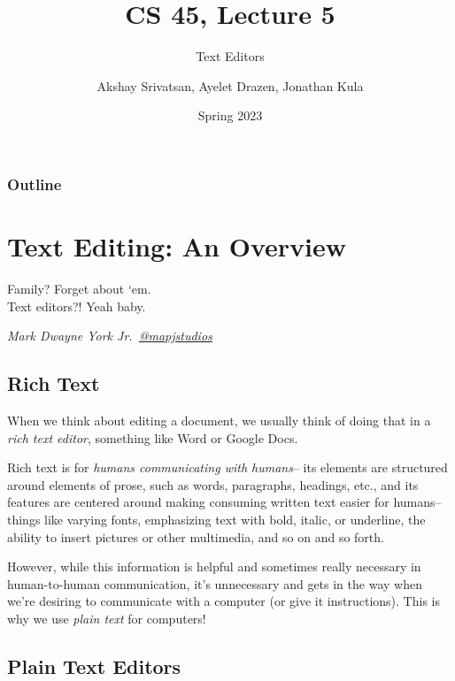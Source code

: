 \usepackage{shared/cs45}
\usepackage{epigraph}

\title{CS 45, Lecture 5}
\subtitle{Text Editors}
\date{Spring 2023}
\author{Akshay Srivatsan, Ayelet Drazen, Jonathan Kula}



\maketitle

\frame{\titlepage}

\begin{frame}
  \frametitle{Outline}
  \tableofcontents[hidesubsections]
\end{frame}

\section{Text Editing: An Overview}

\epigraph{Family? Forget about `em. \\ Text editors?! Yeah baby.}{\textit{Mark Dwayne York Jr.\ \href{https://www.youtube.com/@mapjstudios}{@mapjstudios}}}

\subsection{Rich Text}

When we think about editing a document, we usually think of doing that in 
a {\em rich text editor}, something like Word or Google Docs.

Rich text is for {\em humans communicating with humans}-- its elements
are structured around elements of prose, such as words, paragraphs,
headings, etc., and its features are centered around making consuming
written text easier for humans-- things like varying fonts, emphasizing
text with bold, italic, or underline, the ability to insert pictures
or other multimedia, and so on and so forth.

However, while this information is helpful and sometimes really necessary
in human-to-human communication, it's unnecessary and gets in the way when
we're desiring to communicate with a computer (or give it instructions).
This is why we use {\em plain text} for computers!

\subsection{Plain Text Editors}

